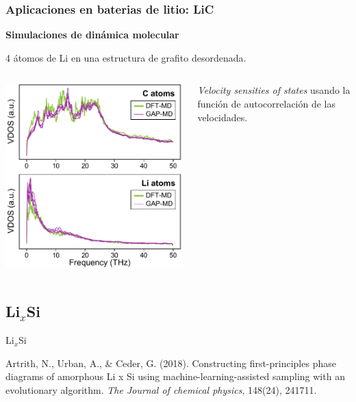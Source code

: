 \documentclass[aspectratio=169]{beamer}
\let\oldtextbf\textbf
\renewcommand{\textbf}[1]{\textcolor{nordblue}{\oldtextbf{#1}}}
\begin{document}
    \begin{frame}
        \frametitle{Aplicaciones en baterias de litio: LiC}

        \textbf{Simulaciones de dinámica molecular}

        4 átomos de Li en una estructura de grafito desordenada.
        
        \begin{columns}
            \begin{center}
                \includegraphics[width=\columnwidth]{LiC-VDOS.png}
            \end{center}
            
            \textit{Velocity sensities of states} usando la función de 
            autocorrelación de las velocidades.
        \end{columns}
    \end{frame}

    \subsection{Li$_x$Si}
    \begin{frame}
        \begin{center}
            {\huge Li$_x$Si}
        \end{center}
        \tiny{
            Artrith, N., Urban, A., \& Ceder, G. (2018). Constructing 
            first-principles phase diagrams of amorphous Li x Si using 
            machine-learning-assisted sampling with an evolutionary algorithm. 
            \textit{The Journal of chemical physics}, 148(24), 241711.
        }
    \end{frame}
    
\end{document}
